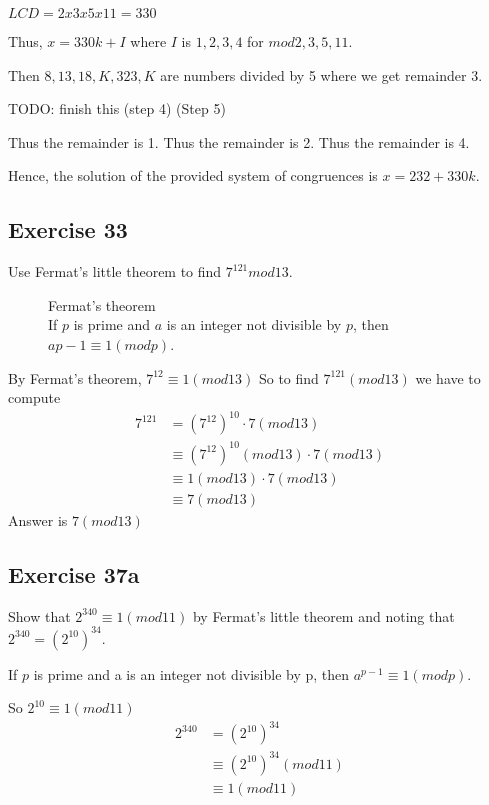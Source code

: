\documentclass[12pt]{article}
\begin{document}
    $LCD = 2x3x5x11=330$

    Thus, $x = 330k+I$ where $I$ is $1,2,3,4$ for $mod 2,3,5,11$.

    Then $8,13,18,K,323,K$ are numbers divided by 5 where we get remainder 3.

    TODO: finish this (step 4)
    (Step 5)

    Thus the remainder is 1.
    Thus the remainder is 2.
    Thus the remainder is 4.

    Hence, the solution of the provided system of congruences is $x = 232 + 330k$.
    
    \subsection{Exercise 33}
    Use Fermat’s little theorem to find $7^{121} mod 13$.

    \begin{figure}[h]
      \label{theorem:fermat}
      \centering    
      Fermat’s theorem\\
      If $p$ is prime and $a$ is an integer not divisible by $p$, then $ap-1\equiv 1 (mod p)$.\\
    \end{figure}

By Fermat’s theorem,
$7^{12} \equiv 1(mod13)$
So to find $7^{121}(mod13)$ we have to compute
\begin{equation}
  \begin{split}
    7^{121}&=(7^{12})^{10}\cdot 7(mod13)\\
    &\equiv (7^{12})^{10}(mod13)\cdot 7(mod13)\\
    &\equiv 1(mod13)\cdot7(mod13)\\
    &\equiv 7(mod13)
  \end{split}
\end{equation}
Answer is $7(mod13)$

\subsection{Exercise 37a}
    Show that $2^{340} \equiv 1 (mod 11)$ by Fermat’s little theorem and noting that $2^{340} = (2^{10})^{34}$.

    If $p$ is prime and a is an integer not divisible by p, then
    $a^{p-1}\equiv 1(mod p)$.


    So $2^{10}\equiv 1(mod11)$
    \begin{equation}
      \begin{split}
        2^{340}&=(2^{10})^{34}\\
        &\equiv(2^{10})^{34}(mod11)\\
        &\equiv 1(mod11)
      \end{split}
    \end{equation}
\end{document}
